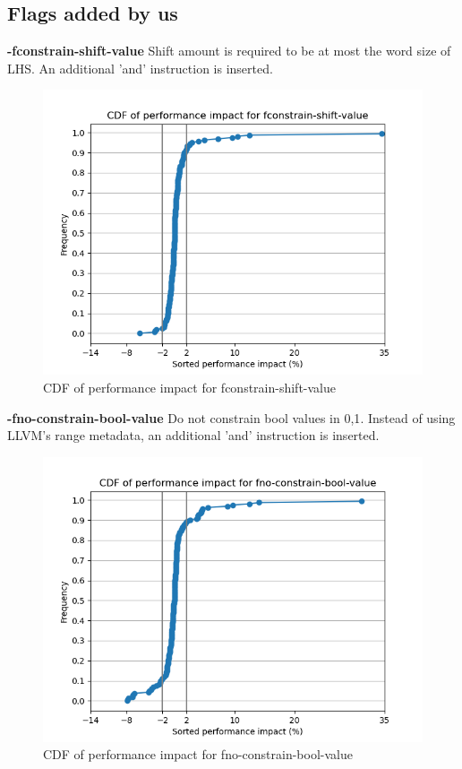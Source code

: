 \documentclass{sciposter}
\begin{document}
\begin{multicols}{3}
\subsection{Flags added by us}
\textbf{-fconstrain-shift-value} Shift amount is required to be at most the word
size of LHS. An additional 'and' instruction is inserted.\\
\begin{figure}[h!]
\centering
\includegraphics[scale=1.2]{fconstrain-shift-value}
\caption{CDF of performance impact for fconstrain-shift-value}
\end{figure}

\textbf{-fno-constrain-bool-value} Do not constrain bool values in {0,1}.
Instead of using LLVM's range metadata, an additional 'and' instruction is
inserted.\\
\begin{figure}[h!]
\centering
\includegraphics[scale=1.2]{fno-constrain-bool-value}
\caption{CDF of performance impact for fno-constrain-bool-value}
\end{figure}


\end{multicols}
\end{document}

